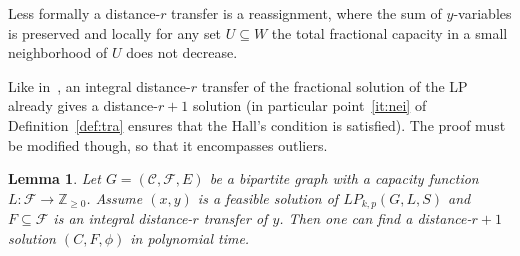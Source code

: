 \documentclass{article}
\newcommand{\F}{\mathcal{F}}
\newcommand{\C}{\mathcal{C}}
\newcommand{\pint}{\mathbb{Z}_{\ge 0}}
\newcommand{\sub}{\subseteq}
\theoremstyle{plain}
\newtheorem{lemma}[theorem]{Lemma}
\theoremstyle{definition}
\begin{document}
Less formally a distance-$r$ transfer is a reassignment,
where the sum of $y$-variables is preserved and 
locally for any set $U \sub W$ the total fractional capacity
in a small neighborhood of $U$ does not decrease.

Like in~\cite{svensson}, an integral distance-$r$
transfer of the fractional solution of the LP already gives a distance-$r+1$
solution (in particular point~\ref{it:nei} of Definition~\ref{def:tra}
ensures that the Hall's condition is satisfied).
The proof must be modified though, so that it encompasses outliers.
\begin{lemma}\label{lem:app}
Let $G=(\C,\F,E)$ be a bipartite graph with a capacity function $L : \F \to
\pint$.
Assume $(x,y)$ is a feasible solution of $LP_{k,p}(G,L,S)$ and $F\sub \F$ is
an integral distance-$r$ transfer of $y$. Then one can find a distance-$r+1$
solution $(C,F,\phi)$ in polynomial time.
\end{lemma}
\end{document}
